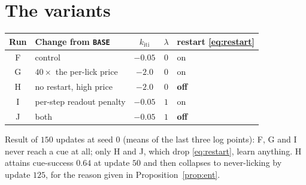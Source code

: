 \documentclass[11pt]{article}
\newcommand{\1}{\mathbf{1}}
\begin{document}
\section{The variants}\label{sec:variants}

\begin{table}[h]\centering
\begin{tabular}{clccl}
\toprule
Run & Change from \texttt{BASE} & $k_{\mathrm{iti}}$ & $\lambda$ & restart \eqref{eq:restart} \\
\midrule
F & control & $-0.05$ & $0$ & on \\
G & $40\times$ the per-lick price & $-2.0$ & $0$ & on \\
H & no restart, high price & $-2.0$ & $0$ & \textbf{off} \\
I & per-step readout penalty & $-0.05$ & $1$ & on \\
J & both & $-0.05$ & $1$ & \textbf{off} \\
\bottomrule
\end{tabular}
\end{table}

\noindent Result of $150$ updates at seed $0$ (means of the last three log points): F, G and I
never reach a cue at all; only H and J, which drop \eqref{eq:restart}, learn anything. H attains
cue-success $0.64$ at update $50$ and then collapses to never-licking by update $125$, for the
reason given in Proposition~\ref{prop:ent}.
\end{document}
